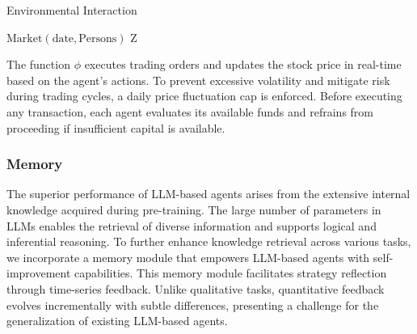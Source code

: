 \begin{algorithm}
\caption{\small Environmental Interaction}
\label{Algorithm_env}

$\text{Market}(\text{date}, \text{Persons})$\;
\Return Z\;
\end{algorithm}

The function $\phi$ executes trading orders and updates the stock price in real-time based on the agent's actions. To prevent excessive volatility and mitigate risk during trading cycles, a daily price fluctuation cap is enforced. Before executing any transaction, each agent evaluates its available funds and refrains from proceeding if insufficient capital is available.

\subsubsection{Memory} 

The superior performance of LLM-based agents arises from the extensive internal knowledge acquired during pre-training. The large number of parameters in LLMs enables the retrieval of diverse information and supports logical and inferential reasoning. To further enhance knowledge retrieval across various tasks, we incorporate a memory module that empowers LLM-based agents with self-improvement capabilities. This memory module facilitates strategy reflection through time-series feedback. Unlike qualitative tasks, quantitative feedback evolves incrementally with subtle differences, presenting a challenge for the generalization of existing LLM-based agents.

